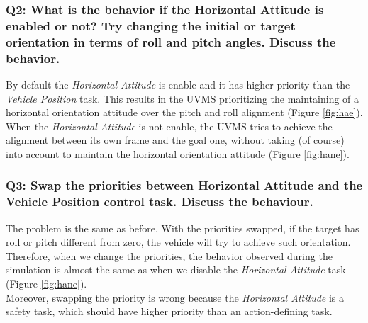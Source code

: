 \documentclass{article}
\begin{document}
\subsubsection{Q2: What is the behavior if the Horizontal Attitude is enabled or not? Try changing the initial or target orientation in terms of roll and pitch angles. Discuss the behavior.} 
By default the \textit{Horizontal Attitude} is enable and it has higher priority than the \textit{Vehicle Position} task. 
This results in the UVMS prioritizing the maintaining of a horizontal orientation attitude over the pitch and roll alignment (Figure  \ref{fig:hae}). \\
When the \textit{Horizontal Attitude} is not enable, the UVMS tries to achieve the alignment between its own frame and the goal one, without taking (of course) into account to maintain the horizontal orientation attitude (Figure  \ref{fig:hane}).

\subsubsection{Q3: Swap the priorities between Horizontal Attitude and the Vehicle Position control task. Discuss the behaviour.}
The problem is the same as before. With the priorities swapped, if the target has roll or pitch different from zero, the vehicle will try to achieve such orientation. \\
Therefore, when we change the priorities, the behavior observed during the simulation is almost the same as when we disable the \textit{Horizontal Attitude} task  (Figure  \ref{fig:hane}).\\
Moreover, swapping the priority is wrong because the \textit{Horizontal Attitude} is a safety task, which should have higher priority than an action-defining task. 
\clearpage
\end{document}
